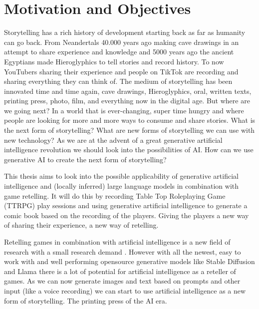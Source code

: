\section{Motivation and Objectives}



Storytelling has a rich history of development starting back as far as humanity can go back. From Neandertals 40.000 years ago making cave drawings in an attempt to share experience and knowledge and 5000 years ago the ancient Egyptians made Hieroglyphics to tell stories and record history. To now YouTubers sharing their experience and people on TikTok are recording and sharing everything they can think of. The medium of storytelling has been innovated time and time again, cave drawings, Hieroglyphics, oral, written texts, printing press, photo, film, and everything now in the digital age. But where are we going next? In a world that is ever-changing, super time hungry and where people are looking for more and more ways to consume and share stories. What is the next form of storytelling? What are new forms of storytelling we can use with new technology? As we are at the advent of a great generative artificial intelligence revolution we should look into the possibilities of AI. How can we use generative AI to create the next form of storytelling?

This thesis aims to look into the possible applicability of generative artificial intelligence and (locally inferred) large language models in combination with game retelling. It will do this by recording Table Top Roleplaying Game (TTRPG) play sessions and using generative artificial intelligence to generate a comic book based on the recording of the players. Giving the players a new way of sharing their experience, a new way of retelling.

Retelling games in combination with artificial intelligence is a new field of research with a small research demand \cite{Gallotta2024LLM}. However with all the newest, easy to work with and well performing opensource generative models like Stable Diffusion \cite{rombach2021highresolution} and Llama \cite{touvron2023llamaopenefficientfoundation} there is a lot of potential for artificial intelligence as a reteller of games. As we can now generate images and text based on prompts and other input (like a voice recording) we can start to use artificial intelligence as a new form of storytelling. The printing press of the AI era.



